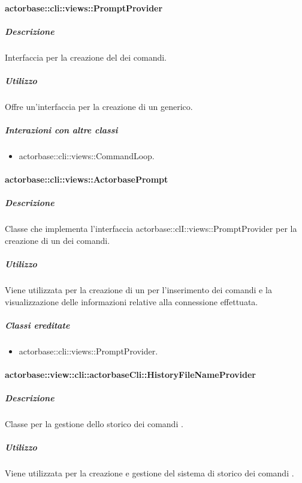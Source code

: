 \documentclass{scalatekids-article}
\begin{document}
\paragraph{actorbase::cli::views::PromptProvider}

\subparagraph{Descrizione}

Interfaccia per la creazione del  dei comandi.

\subparagraph{Utilizzo}

Offre un'interfaccia per la creazione di un  generico.

\subparagraph{Interazioni con altre classi}

\begin{itemize}
\item actorbase::cli::views::CommandLoop.
\end{itemize}

\paragraph{actorbase::cli::views::ActorbasePrompt}

\subparagraph{Descrizione}

Classe che implementa l'interfaccia actorbase::clI::views::PromptProvider per la creazione di un  dei comandi.

\subparagraph{Utilizzo}

Viene utilizzata per la creazione di un  per l'inserimento dei comandi e la visualizzazione delle informazioni relative alla connessione effettuata. %

\subparagraph{Classi ereditate}

\begin{itemize}
\item actorbase::cli::views::PromptProvider.
\end{itemize}

\paragraph{actorbase::view::cli::actorbaseCli::HistoryFileNameProvider}

\subparagraph{Descrizione}

Classe per la gestione dello storico dei comandi .

\subparagraph{Utilizzo}

Viene utilizzata per la creazione e gestione del sistema di storico dei comandi .
\end{document}
